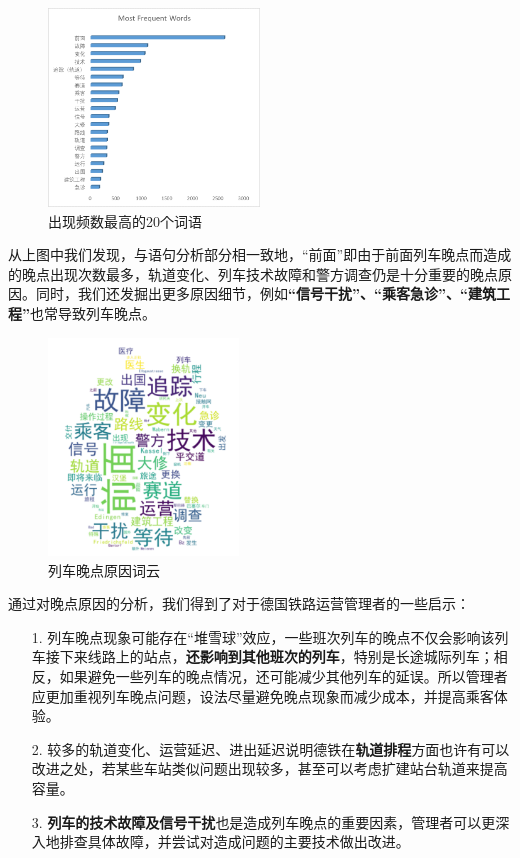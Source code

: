 \documentclass[lang=cn,12pt,a4paper,cite=authoryear]{elegantpaper}
\begin{document}
\begin{figure}[H]
	\centering
	\includegraphics[width=0.5\textwidth]{image/freq.png}
	\caption{出现频数最高的20个词语}
	\label{fig7}
\end{figure}

从上图中我们发现，与语句分析部分相一致地，“前面”即由于前面列车晚点而造成的晚点出现次数最多，轨道变化、列车技术故障和警方调查仍是十分重要的晚点原因。同时，我们还发掘出更多原因细节，例如\textbf{“信号干扰”、“乘客急诊”、“建筑工程”}也常导致列车晚点。

\begin{figure}[H]
	\centering
	\includegraphics[width=0.45\textwidth]{image/word_cloud.png}
	\caption{列车晚点原因词云}
	\label{fig8}
\end{figure}

通过对晚点原因的分析，我们得到了对于德国铁路运营管理者的一些启示：
\begin{itemize}
	\item[1.] 列车晚点现象可能存在“堆雪球”效应，一些班次列车的晚点不仅会影响该列车接下来线路上的站点，\textbf{还影响到其他班次的列车}，特别是长途城际列车；相反，如果避免一些列车的晚点情况，还可能减少其他列车的延误。所以管理者应更加重视列车晚点问题，设法尽量避免晚点现象而减少成本，并提高乘客体验。
	\item[2.] 较多的轨道变化、运营延迟、进出延迟说明德铁在\textbf{轨道排程}方面也许有可以改进之处，若某些车站类似问题出现较多，甚至可以考虑扩建站台轨道来提高容量。
	\item[3.] \textbf{列车的技术故障及信号干扰}也是造成列车晚点的重要因素，管理者可以更深入地排查具体故障，并尝试对造成问题的主要技术做出改进。
\end{itemize}
\end{document}
